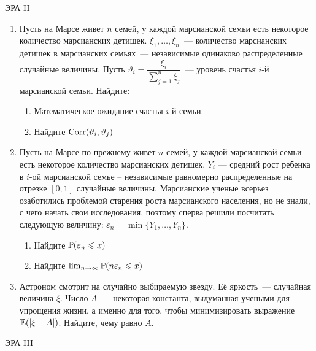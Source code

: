 \documentclass[12pt, a4paper]{article}\usepackage[]{graphicx}\usepackage[]{color}
\begin{document}
						\begin{center}
							ЭРА II
						\end{center}

						\begin{enumerate}
							\item Пусть на Марсе живет $n$ семей, y каждой марсианской семьи есть некоторое количество марсианских детишек. $\xi_1, \ldots, \xi_n$~--- количество марсианских детишек в марсианских семьях~--- независимые одинаково распределенные случайные величины. Пусть $\vartheta_i = \dfrac{\xi_i}{\sum_{j = 1}^n \xi_j}$~--- уровень счастья $i$-й марсианской семьи. Найдите:

							\begin{enumerate}
								\item Математическое ожидание счастья $i$-й семьи.
								\item Найдите $ \Corr (\vartheta_i, \vartheta_j)$
							\end{enumerate}

							\item Пусть на Марсе по-прежнему живет $n$ семей, у каждой марсианской семьи есть некоторое количество марсианских детишек. $Y_i$ — средний рост ребенка в $i$-ой марсианской семье -- независимые равномерно распределенные на отрезке $[0; 1]$ случайные величины. Марсианские ученые всерьез озаботились проблемой старения роста марсианского населения, но не знали, с чего начать свои исследования, поэтому сперва решили посчитать следующую величину:  $\varepsilon_n = \min \{Y_1, \ldots, Y_n\}$.

							\begin{enumerate}
								\item Найдите $\P (\varepsilon_n \leq x)$
								\item Найдите $\lim_{n \rightarrow \infty} \P (n\varepsilon_n \leq x)$
							\end{enumerate}

							\item Астроном смотрит на случайно выбираемую звезду. Её яркость~--- случайная величина $\xi$. Число $A$~--- некоторая константа, выдуманная учеными для упрощения жизни, а именно для того, чтобы минимизировать выражение $\E(|\xi - A|)$. Найдите, чему равно $A$.
						\end{enumerate}


						\begin{center}
							ЭРА III
						\end{center}
\end{document}
